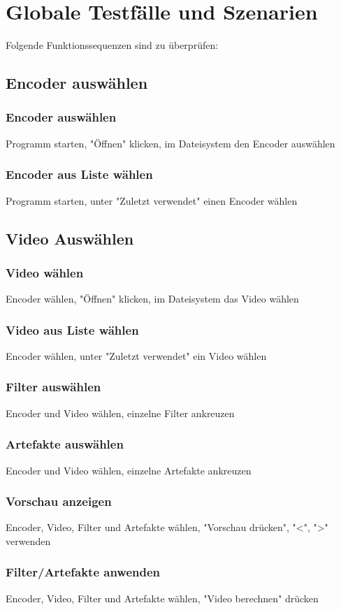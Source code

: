 \documentclass[parskip=full]{scrartcl}
\begin{document}
\section{Globale Testfälle und Szenarien}
Folgende Funktionssequenzen sind zu überprüfen:
\subsection{Encoder auswählen}
\subsubsection{Encoder auswählen}
Programm starten, "Öffnen" klicken, im Dateisystem den Encoder auswählen
\subsubsection{Encoder aus Liste wählen}
Programm starten, unter "Zuletzt verwendet" einen Encoder wählen
\subsection{Video Auswählen}
\subsubsection{Video wählen}
Encoder wählen, "Öffnen" klicken, im Dateisystem das Video wählen
\subsubsection{Video aus Liste wählen}
Encoder wählen, unter "Zuletzt verwendet" ein Video wählen
\subsubsection{Filter auswählen}
Encoder und Video wählen, einzelne Filter ankreuzen
\subsubsection{Artefakte auswählen}
Encoder und Video wählen, einzelne Artefakte ankreuzen
\subsubsection{Vorschau anzeigen}
Encoder, Video, Filter und Artefakte wählen, "Vorschau drücken", "<", ">" verwenden
\subsubsection{Filter/Artefakte anwenden}
Encoder, Video, Filter und Artefakte wählen, "Video berechnen" drücken
\end{document}

